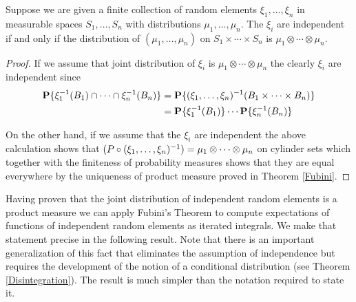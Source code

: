 \begin{lem}\label{IndependenceProductMeasures}Suppose we are given a finite collection of
  random elements $\xi_1, \dots, \xi_n$ in measurable spaces
  $S_1, \dots, S_n$ with distributions $\mu_1, \dots, \mu_n$.  The
  $\xi_i$ are independent if and only if the distribution of $(\mu_1,
  \dots, \mu_n)$ on $S_1 \times \cdots \times S_n$ is $\mu_1 \otimes
  \cdots \otimes \mu_n$.
\end{lem}
\begin{proof}If we assume that joint distribution of $\xi_i$ is $\mu_1 \otimes
  \cdots \otimes \mu_n$ the clearly $\xi_i$ are independent since 
\begin{align*}
\probability{\xi_1^{-1}(B_1) \cap \cdots \cap \xi_n^{-1}(B_n)} &=
\probability{(\xi_1, \dots, \xi_n)^{-1}(B_1 \times \cdots \times B_n)}
  \\
&=\probability{\xi_1^{-1}(B_1)} \cdots \probability{\xi_n^{-1}(B_n)}
\end{align*}

On the other hand, if we assume that the $\xi_i$ are independent the
above calculation shows that $(\pushforward{(\xi_1, \dots, \xi_n)}{P}) =
\mu_1 \otimes \cdots \otimes \mu_n$ on cylinder sets which together
with the finiteness of probability measures shows that
they are equal everywhere by the uniqueness of product measure proved
in Theorem \ref{Fubini}.
\end{proof}

Having proven that the joint distribution of independent random
elements is a product measure we can apply Fubini's Theorem to compute
expectations of functions of independent random elements as iterated
integrals.  We make that statement precise in the following result.
Note that there is an important generalization of this fact that
eliminates the assumption of independence but requires the development
of the notion of a conditional distribution (see Theorem
\ref{Disintegration}).  The result is much simpler than the notation
required to state it.


